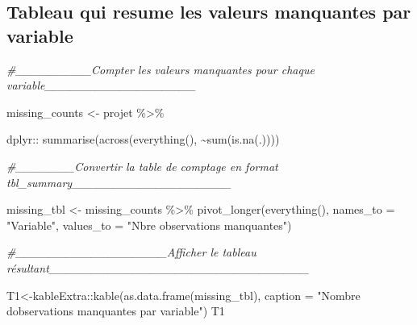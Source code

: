 \documentclass[
  14pt,
]{article}
\newenvironment{Shaded}{\begin{snugshade}}{\end{snugshade}}
\newcommand{\AttributeTok}[1]{\textcolor[rgb]{0.77,0.63,0.00}{#1}}
\newcommand{\CommentTok}[1]{\textcolor[rgb]{0.56,0.35,0.01}{\textit{#1}}}
\newcommand{\FunctionTok}[1]{\textcolor[rgb]{0.00,0.00,0.00}{#1}}
\newcommand{\NormalTok}[1]{#1}
\newcommand{\OtherTok}[1]{\textcolor[rgb]{0.56,0.35,0.01}{#1}}
\newcommand{\SpecialCharTok}[1]{\textcolor[rgb]{0.00,0.00,0.00}{#1}}
\newcommand{\StringTok}[1]{\textcolor[rgb]{0.31,0.60,0.02}{#1}}
\begin{document}
\hypertarget{tableau-qui-resume-les-valeurs-manquantes-par-variable}{%
\subsection{\texorpdfstring{Tableau qui resume les valeurs manquantes
par variable\\
}{Tableau qui resume les valeurs manquantes par variable }}\label{tableau-qui-resume-les-valeurs-manquantes-par-variable}}

\begin{Shaded}
\begin{Highlighting}[]
\CommentTok{\#\_\_\_\_\_\_\_\_\_Compter les valeurs manquantes pour chaque variable\_\_\_\_\_\_\_\_\_\_\_\_\_\_\_\_\_\_}

\NormalTok{missing\_counts }\OtherTok{\textless{}{-}}\NormalTok{ projet }\SpecialCharTok{\%\textgreater{}\%} 
  
\NormalTok{  dplyr}\SpecialCharTok{::} \FunctionTok{summarise}\NormalTok{(}\FunctionTok{across}\NormalTok{(}\FunctionTok{everything}\NormalTok{(), }
                           \SpecialCharTok{\textasciitilde{}}\FunctionTok{sum}\NormalTok{(}\FunctionTok{is.na}\NormalTok{(.))))}

\CommentTok{\#\_\_\_\_\_\_\_Convertir la table de comptage en format tbl\_summary\_\_\_\_\_\_\_\_\_\_\_\_\_\_\_\_\_\_\_}

\NormalTok{missing\_tbl }\OtherTok{\textless{}{-}}\NormalTok{ missing\_counts }\SpecialCharTok{\%\textgreater{}\%}
  \FunctionTok{pivot\_longer}\NormalTok{(}\FunctionTok{everything}\NormalTok{(), }
               \AttributeTok{names\_to =} \StringTok{"Variable"}\NormalTok{,}
               \AttributeTok{values\_to =} \StringTok{"Nbre observations manquantes"}\NormalTok{) }

\CommentTok{\#\_\_\_\_\_\_\_\_\_\_\_\_\_\_\_\_\_\_Afficher le tableau résultant\_\_\_\_\_\_\_\_\_\_\_\_\_\_\_\_\_\_\_\_\_\_\_\_\_\_\_\_\_\_\_}

\NormalTok{T1}\OtherTok{\textless{}{-}}\NormalTok{kableExtra}\SpecialCharTok{::}\FunctionTok{kable}\NormalTok{(}\FunctionTok{as.data.frame}\NormalTok{(missing\_tbl),}
                      \AttributeTok{caption =} \StringTok{"Nombre d\textquotesingle{}observations}
\StringTok{                      manquantes par variable"}\NormalTok{)}
\NormalTok{T1}
\end{Highlighting}
\end{Shaded}
\end{document}
